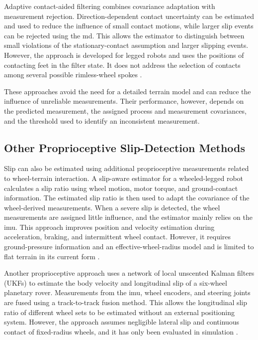 \documentclass[report.tex]{subfiles}
\begin{document}
    Adaptive contact-aided filtering combines covariance adaptation with measurement rejection. Direction-dependent contact uncertainty can be estimated and used to reduce the influence of small contact motions, while larger slip events can be rejected using the \gls{md}. This allows the estimator to distinguish between small violations of the stationary-contact assumption and larger slipping events. However, the approach is developed for legged robots and uses the positions of contacting feet in the filter state. It does not address the selection of contacts among several possible rimless-wheel spokes \cite{Kim2025}.

    These approaches avoid the need for a detailed terrain model and can reduce the influence of unreliable measurements. Their performance, however, depends on the predicted measurement, the assigned process and measurement covariances, and the threshold used to identify an inconsistent measurement.

    \subsection{Other Proprioceptive Slip-Detection Methods}
    \label{subsec:sota_other_slip}

    Slip can also be estimated using additional proprioceptive measurements related to wheel-terrain interaction. A slip-aware estimator for a wheeled-legged robot calculates a slip ratio using wheel motion, motor torque, and ground-contact information. The estimated slip ratio is then used to adapt the covariance of the wheel-derived measurements. When a severe slip is detected, the wheel measurements are assigned little influence, and the estimator mainly relies on the \gls{imu}. This approach improves position and velocity estimation during acceleration, braking, and intermittent wheel contact. However, it requires ground-pressure information and an effective-wheel-radius model and is limited to flat terrain in its current form \cite{Xu2024}.

    Another proprioceptive approach uses a network of local unscented Kalman filters (UKFs) to estimate the body velocity and longitudinal slip of a six-wheel planetary rover. Measurements from the \gls{imu}, wheel encoders, and steering joints are fused using a track-to-track fusion method. This allows the longitudinal slip ratio of different wheel sets to be estimated without an external positioning system. However, the approach assumes negligible lateral slip and continuous contact of fixed-radius wheels, and it has only been evaluated in simulation \cite{Zarei2024}.
\end{document}
